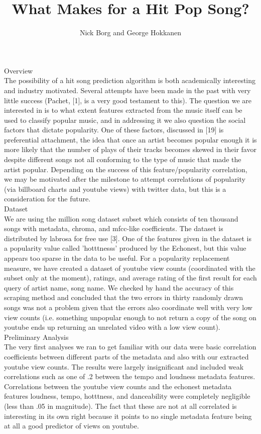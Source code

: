 \documentclass[11pt]{amsart}
\title{What Makes for a Hit Pop Song?}
\author{Nick Borg and George Hokkanen}
\begin{document}
\maketitle
{\huge Overview \huge} \\

The possibility of a hit song prediction algorithm is both academically interesting and industry motivated. Several attempts have been made in the past with very little success (Pachet, [1], is a very good testament to this). The question we are interested in is to what extent features extracted from the music itself can be used to classify popular music, and in addressing it we also question the social factors that dictate popularity. One of these factors, discussed in [19] is preferential attachment, the idea that once an artist becomes popular enough it is more likely that the number of plays of their tracks becomes skewed in their favor despite different songs not all conforming to the type of music that made the artist popular. Depending on the success of this feature/popularity correlation, we may be motivated after the milestone to attempt correlations of popularity (via billboard charts and youtube views) with twitter data, but this is a consideration for the future. \\

{\huge Dataset \huge} \\

We are using the million song dataset subset which consists of ten thousand songs with metadata, chroma, and mfcc-like coefficients. The dataset is distributed by labrosa for free use [3]. One of the features given in the dataset is a popularity value called 'hotttnesss' produced by the Echonest, but this value appears too sparse in the data to be useful. For a popularity replacement measure, we have created a dataset of youtube view counts (coordinated with the subset only at the moment), ratings, and average rating of the first result for each query of artist name, song name. We checked by hand the accuracy of this scraping method and concluded that the two errors in thirty randomly drawn songs was not a problem given that the errors also coordinate well with very low view counts (i.e. something unpopular enough to not return a copy of the song on youtube ends up returning an unrelated video with a low view count). \\

{\huge Preliminary Analysis \huge} \\

The very first analyses we ran to get familiar with our data were basic correlation coefficients between different parts of the metadata and also with our extracted youtube view counts. The results were largely insignificant and included weak correlations such as one of .2 between the tempo and loudness metadata features. Correlations between the youtube view counts and the echonest metadata features loudness, tempo, hotttness, and danceability were completely negligible (less than .05 in magnitude). The fact that these are not at all correlated is interesting in its own right because it points to no single metadata feature being at all a good predictor of views on youtube. \\
\end{document}
